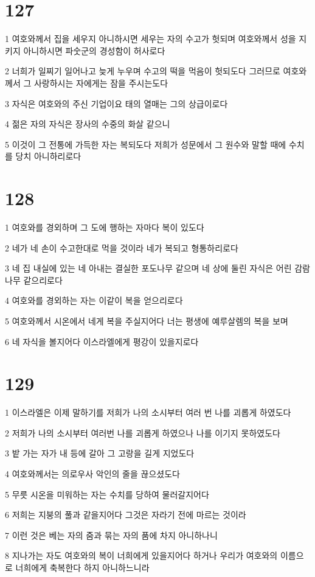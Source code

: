 \chapter{127}

\par 1 여호와께서 집을 세우지 아니하시면 세우는 자의 수고가 헛되며 여호와께서 성을 지키지 아니하시면 파숫군의 경성함이 허사로다
\par 2 너희가 일찌기 일어나고 늦게 누우며 수고의 떡을 먹음이 헛되도다 그러므로 여호와께서 그 사랑하시는 자에게는 잠을 주시는도다
\par 3 자식은 여호와의 주신 기업이요 태의 열매는 그의 상급이로다
\par 4 젊은 자의 자식은 장사의 수중의 화살 같으니
\par 5 이것이 그 전통에 가득한 자는 복되도다 저희가 성문에서 그 원수와 말할 때에 수치를 당치 아니하리로다

\chapter{128}

\par 1 여호와를 경외하며 그 도에 행하는 자마다 복이 있도다
\par 2 네가 네 손이 수고한대로 먹을 것이라 네가 복되고 형통하리로다
\par 3 네 집 내실에 있는 네 아내는 결실한 포도나무 같으며 네 상에 둘린 자식은 어린 감람나무 같으리로다
\par 4 여호와를 경외하는 자는 이같이 복을 얻으리로다
\par 5 여호와께서 시온에서 네게 복을 주실지어다 너는 평생에 예루살렘의 복을 보며
\par 6 네 자식을 볼지어다 이스라엘에게 평강이 있을지로다

\chapter{129}

\par 1 이스라엘은 이제 말하기를 저희가 나의 소시부터 여러 번 나를 괴롭게 하였도다
\par 2 저희가 나의 소시부터 여러번 나를 괴롭게 하였으나 나를 이기지 못하였도다
\par 3 밭 가는 자가 내 등에 갈아 그 고랑을 길게 지었도다
\par 4 여호와께서는 의로우사 악인의 줄을 끊으셨도다
\par 5 무릇 시온을 미워하는 자는 수치를 당하여 물러갈지어다
\par 6 저희는 지붕의 풀과 같을지어다 그것은 자라기 전에 마르는 것이라
\par 7 이런 것은 베는 자의 줌과 묶는 자의 품에 차지 아니하나니
\par 8 지나가는 자도 여호와의 복이 너희에게 있을지어다 하거나 우리가 여호와의 이름으로 너희에게 축복한다 하지 아니하느니라

